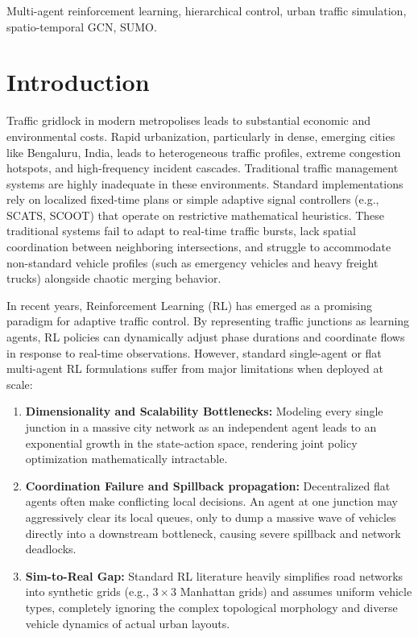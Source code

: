 \documentclass[conference]{IEEEtran}
\begin{document}
\begin{IEEEkeywords}
Multi-agent reinforcement learning, hierarchical control, urban traffic simulation, spatio-temporal GCN, SUMO.
\end{IEEEkeywords}

\section{Introduction}
Traffic gridlock in modern metropolises leads to substantial economic and environmental costs. Rapid urbanization, particularly in dense, emerging cities like Bengaluru, India, leads to heterogeneous traffic profiles, extreme congestion hotspots, and high-frequency incident cascades. Traditional traffic management systems are highly inadequate in these environments. Standard implementations rely on localized fixed-time plans or simple adaptive signal controllers (e.g., SCATS, SCOOT) that operate on restrictive mathematical heuristics. These traditional systems fail to adapt to real-time traffic bursts, lack spatial coordination between neighboring intersections, and struggle to accommodate non-standard vehicle profiles (such as emergency vehicles and heavy freight trucks) alongside chaotic merging behavior.

In recent years, Reinforcement Learning (RL) has emerged as a promising paradigm for adaptive traffic control. By representing traffic junctions as learning agents, RL policies can dynamically adjust phase durations and coordinate flows in response to real-time observations. However, standard single-agent or flat multi-agent RL formulations suffer from major limitations when deployed at scale:
\begin{enumerate}
    \item \textbf{Dimensionality and Scalability Bottlenecks:} Modeling every single junction in a massive city network as an independent agent leads to an exponential growth in the state-action space, rendering joint policy optimization mathematically intractable.
    \item \textbf{Coordination Failure and Spillback propagation:} Decentralized flat agents often make conflicting local decisions. An agent at one junction may aggressively clear its local queues, only to dump a massive wave of vehicles directly into a downstream bottleneck, causing severe spillback and network deadlocks.
    \item \textbf{Sim-to-Real Gap:} Standard RL literature heavily simplifies road networks into synthetic grids (e.g., $3 \times 3$ Manhattan grids) and assumes uniform vehicle types, completely ignoring the complex topological morphology and diverse vehicle dynamics of actual urban layouts.
\end{enumerate}
\end{document}

